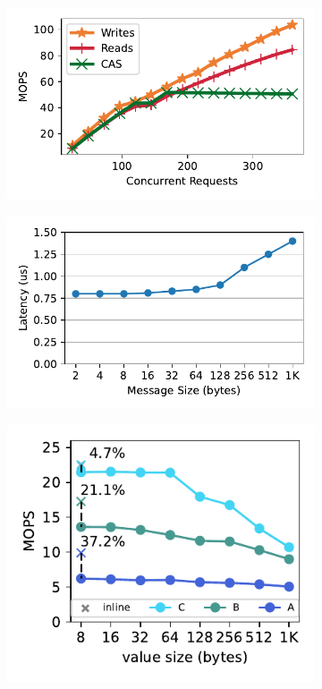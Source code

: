 \begin{figure}[t]
    \centering
    \newcommand{\subfigwidth}{0.24\linewidth}
    \begin{subfigure}{\subfigwidth}
        \includegraphics[width=0.99\linewidth]{fig/rdma_concur.pdf}
    \end{subfigure}
    \begin{subfigure}{\subfigwidth}
        \includegraphics[width=0.99\linewidth]{fig/rdma_latency.pdf}
    \end{subfigure}
    \begin{subfigure}{\subfigwidth}
      \includegraphics[width=0.99\linewidth]{fig/extent.pdf}

\end{subfigure}
\end{figure}
